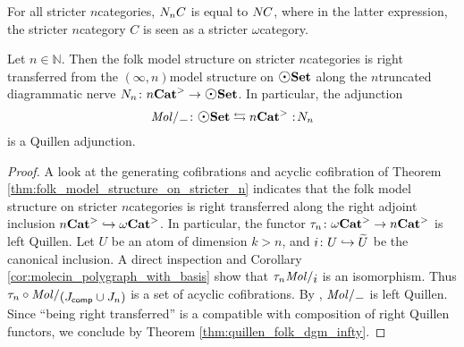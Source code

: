 \begin{rmk}
    For all stricter \( n \)\nbd categories, \( N_{n} C \) is equal to \( N_{} C \), where in the latter expression, the stricter \( n \)\nbd category \( C \) is seen as a stricter \( \omega \)\nbd category.
\end{rmk}

\begin{cor}\label{cor:quillen_folk_dgm_n}
    Let \( n \in \mathbb{N} \).
    Then the folk model structure on stricter \( n \)\nbd categories is right transferred from the \( (\infty, n) \)\nbd model structure on \( \dgmSet \) along the \( n \)\nbd truncated diagrammatic nerve \( \N{n} \colon \snCat{n} \to \dgmSet \).
    In particular, the adjunction 
    \begin{equation*}
        \molecin{-} \colon \dgmSet \leftrightarrows \snCat{n} \cocolon \N{n}
    \end{equation*}
    is a Quillen adjunction.
\end{cor}
\begin{proof}
    A look at the generating cofibrations and acyclic cofibration of Theorem \ref{thm:folk_model_structure_on_stricter_n} indicates that the folk model structure on stricter \( n \)\nbd categories is right transferred along the right adjoint inclusion \( {n\mathbf{Cat}}^> \hookrightarrow {\omega\mathbf{Cat}}^> \).  
    In particular, the functor \( \tau_{n} \colon {\omega\mathbf{Cat}}^> \to {n\mathbf{Cat}}^> \) is left Quillen.
    Let \( U \) be an atom of dimension \( k > n \), and \( i \colon U \hookrightarrow \widetilde{U} \) be the canonical inclusion.
    A direct inspection and Corollary \ref{cor:molecin_polygraph_with_basis} show that \( \trunc{n}\molecin{i} \) is an isomorphism.
    Thus \( \trunc{n} \after \molecin{(\Jcomp \cup \Jn{n})} \) is a set of acyclic cofibrations.
    By \cite[E.2.14]{joyal2008theory}, \( \molecin{-} \) is left Quillen. 
    Since ``being right transferred'' is a compatible with composition of right Quillen functors, we conclude by Theorem \ref{thm:quillen_folk_dgm_infty}.
\end{proof}




